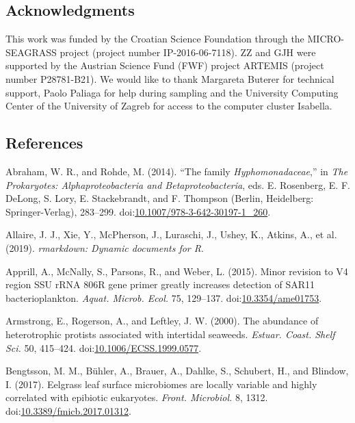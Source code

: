 \documentclass[
  12pt,
]{article}
\begin{document}
\hypertarget{acknowledgments}{%
\subsection{Acknowledgments}\label{acknowledgments}}

This work was funded by the Croatian Science Foundation through the
MICRO-SEAGRASS project (project number IP-2016-06-7118). ZZ and GJH were
supported by the Austrian Science Fund (FWF) project ARTEMIS (project
number P28781-B21). We would like to thank Margareta Buterer for
technical support, Paolo Paliaga for help during sampling and the
University Computing Center of the University of Zagreb for access to
the computer cluster Isabella.

\newpage

\hypertarget{references}{%
\subsection{References}\label{references}}

 \setlength{\emergencystretch}{3.5em}

\hypertarget{refs}{}
\leavevmode\hypertarget{ref-Abraham2014}{}%
Abraham, W. R., and Rohde, M. (2014). ``The family
\emph{Hyphomonadaceae},'' in \emph{The Prokaryotes: Alphaproteobacteria
and Betaproteobacteria}, eds. E. Rosenberg, E. F. DeLong, S. Lory, E.
Stackebrandt, and F. Thompson (Berlin, Heidelberg: Springer-Verlag),
283--299.
doi:\href{https://doi.org/10.1007/978-3-642-30197-1_260}{10.1007/978-3-642-30197-1\_260}.

\leavevmode\hypertarget{ref-Allaire2019}{}%
Allaire, J. J., Xie, Y., McPherson, J., Luraschi, J., Ushey, K., Atkins,
A., et al. (2019). \emph{rmarkdown: Dynamic documents for R}.

\leavevmode\hypertarget{ref-Apprill2015}{}%
Apprill, A., McNally, S., Parsons, R., and Weber, L. (2015). Minor
revision to V4 region SSU rRNA 806R gene primer greatly increases
detection of SAR11 bacterioplankton. \emph{Aquat. Microb. Ecol.} 75,
129--137. doi:\href{https://doi.org/10.3354/ame01753}{10.3354/ame01753}.

\leavevmode\hypertarget{ref-Armstrong2000}{}%
Armstrong, E., Rogerson, A., and Leftley, J. W. (2000). The abundance of
heterotrophic protists associated with intertidal seaweeds.
\emph{Estuar. Coast. Shelf Sci.} 50, 415--424.
doi:\href{https://doi.org/10.1006/ECSS.1999.0577}{10.1006/ECSS.1999.0577}.

\leavevmode\hypertarget{ref-Bengtsson2017}{}%
Bengtsson, M. M., Bühler, A., Brauer, A., Dahlke, S., Schubert, H., and
Blindow, I. (2017). Eelgrass leaf surface microbiomes are locally
variable and highly correlated with epibiotic eukaryotes. \emph{Front.
Microbiol.} 8, 1312.
doi:\href{https://doi.org/10.3389/fmicb.2017.01312}{10.3389/fmicb.2017.01312}.
\end{document}
